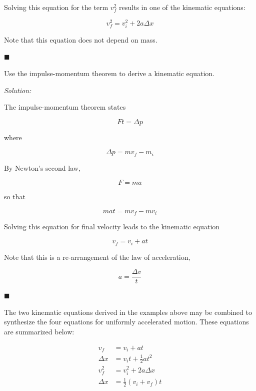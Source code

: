 \documentclass[dvipsnames]{article}
\begin{document}
Solving this equation for the term $v_f^2$ results in one of the kinematic equations:

\begin{equation*}
    \boxed{v_f^2 = v_i^2 + 2 a \Delta x}
\end{equation*}

Note that this equation does not depend on mass.

\hfill $\blacksquare$

\begin{example}
    Use the impulse-momentum theorem to derive a kinematic equation.
\end{example}

\textit{Solution:}

The impulse-momentum theorem states

\begin{equation*}
    F t = \Delta p
\end{equation*}

where 

\begin{equation*}
    \Delta p = m v_f - m_i
\end{equation*}

By Newton's second law,

\begin{equation*}
    F = ma
\end{equation*}

so that

\begin{equation*}
    ma t = m v_f - mv_i
\end{equation*}

Solving this equation for final velocity leads to the kinematic equation

\begin{equation*}
    \boxed{v_f = v_i + at}
\end{equation*}

Note that this is a re-arrangement of the law of acceleration,

\begin{equation*}
    a = \frac{\Delta v}{t}
\end{equation*}

\hfill $\blacksquare$

The two kinematic equations derived in the examples above may be combined to synthesize the four equations for uniformly accelerated motion. These equations are summarized below:

\begin{align}
    v_f &= v_i + a t \label{Ty1d0} \\[1ex]
    \Delta x &= v_i t + \frac{1}{2}a t^2 \label{bxVcq} \\[1ex]
    v_f^2 &= v_i^2 + 2 a \Delta x \label{UOYTP} \\[1ex]
    \Delta x &= \frac{1}{2} \left(v_i + v_f\right) \label{vGg8T} t
\end{align}
\end{document}
